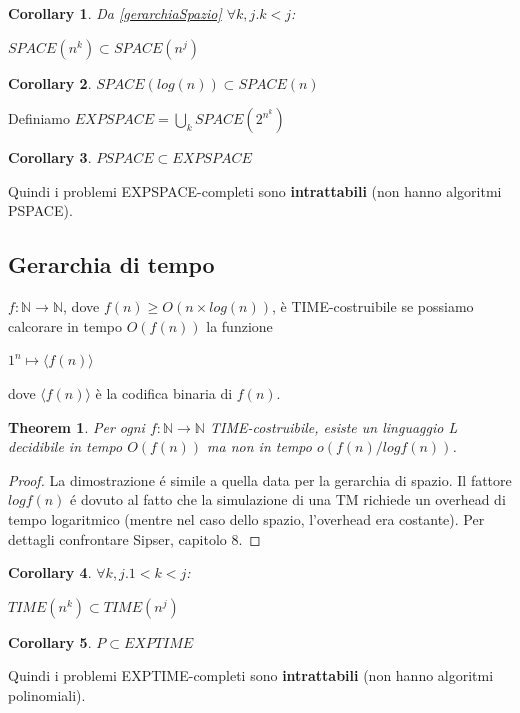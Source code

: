 \documentclass[a4paper, 12pt]{article}
\newtheorem{theorem}{Theorem}[section]
\newtheorem{corollary}{Corollary}[theorem]
\begin{document}
\begin{corollary}
Da \ref{gerarchiaSpazio} $\forall k,j. k < j$:
\begin{center}
$SPACE(n^{k}) \subset SPACE(n^{j})$
\end{center}
\end{corollary}
\begin{corollary}
$SPACE(log(n)) \subset SPACE(n)$
\end{corollary}
Definiamo $EXPSPACE =  \bigcup_{k}SPACE(2^{n^{k}})$
\begin{corollary}
$PSPACE \subset EXPSPACE$
\end{corollary}
Quindi i problemi EXPSPACE-completi sono \textbf{intrattabili} (non hanno algoritmi PSPACE).

\subsection{Gerarchia di tempo}
$f: \mathbb{N} \rightarrow \mathbb{N}$, dove $f(n) \geq O(n \times log(n))$, \`e TIME-costruibile se possiamo calcorare in tempo $O(f(n))$ la funzione
\begin{center}
$1^{n} \longmapsto \langle f(n) \rangle$
\end{center}
dove $\langle f(n) \rangle$ \`e la codifica binaria di $f(n)$.
\begin{theorem}
Per ogni $f:\mathbb{N} \rightarrow \mathbb{N}$ TIME-costruibile, esiste un linguaggio L decidibile in tempo $O(f(n))$ ma non in tempo $o(f(n) / log f(n))$.
\end{theorem}
\begin{proof}
La dimostrazione é simile a quella data per la gerarchia di spazio. Il fattore $log f(n)$ é dovuto al fatto che la simulazione di una TM richiede un overhead di tempo logaritmico (mentre nel caso dello spazio, l’overhead era costante). Per dettagli confrontare Sipser, capitolo 8.
\end{proof}

\begin{corollary}
$\forall k,j. 1<k<j$: \begin{center}
$TIME(n^{k}) \subset TIME(n^{j})$
\end{center}
\end{corollary}
\begin{corollary}
$P \subset EXPTIME$
\end{corollary}
Quindi i problemi EXPTIME-completi sono \textbf{intrattabili} (non hanno algoritmi polinomiali).
\end{document}
